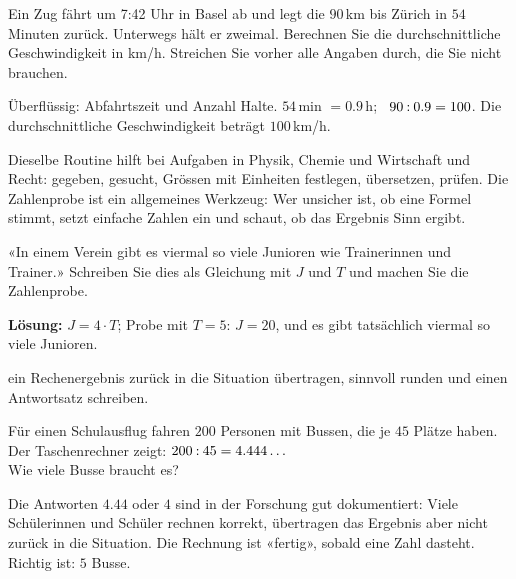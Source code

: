 \documentclass[11pt]{exam}
\begin{document}
\begin{questions}
\question Ein Zug fährt um 7:42 Uhr in Basel ab und legt die $90$\,km bis
Zürich in $54$ Minuten zurück. Unterwegs hält er zweimal.
Berechnen Sie die durchschnittliche Geschwindigkeit in km/h. Streichen Sie
vorher alle Angaben durch, die Sie nicht brauchen.
\begin{solution}
  Überflüssig: Abfahrtszeit und Anzahl Halte. $54$\,min $= 0.9$\,h;
  \ $90 \mathbin{:} 0.9 = 100$. Die durchschnittliche Geschwindigkeit beträgt
  $100$\,km/h.
\end{solution}
\raum{3cm}

\end{questions}

\begin{transfer}
Dieselbe Routine hilft bei Aufgaben in Physik, Chemie und Wirtschaft und
Recht: gegeben, gesucht, Grössen mit Einheiten festlegen, übersetzen, prüfen.
Die Zahlenprobe ist ein allgemeines Werkzeug: Wer unsicher ist, ob eine
Formel stimmt, setzt einfache Zahlen ein und schaut, ob das Ergebnis Sinn
ergibt.
\end{transfer}

\begin{exitfrage}
«In einem Verein gibt es viermal so viele Junioren wie Trainerinnen und
Trainer.» Schreiben Sie dies als Gleichung mit $J$ und $T$ und machen Sie die
Zahlenprobe.
\ifprintanswers\par\medskip\textbf{Lösung:} $J = 4 \cdot T$; Probe mit
$T = 5$: $J = 20$, und es gibt tatsächlich viermal so viele Junioren.
\else\par\vspace{1.5cm}\fi
\end{exitfrage}

\newpage
{}
  {ein Rechenergebnis zurück in die Situation übertragen, sinnvoll runden und
   einen Antwortsatz schreiben.}

\begin{einstieg}
Für einen Schulausflug fahren $200$ Personen mit Bussen, die je $45$ Plätze
haben. Der Taschenrechner zeigt: $200 \mathbin{:} 45 = 4.444\ldots$ \\
Wie viele Busse braucht es?
\ifprintanswers\else\par\vspace{1cm}\fi
\end{einstieg}

\begin{lehrperson}
Die Antworten $4.44$ oder $4$ sind in der Forschung gut dokumentiert: Viele
Schülerinnen und Schüler rechnen korrekt, übertragen das Ergebnis aber nicht
zurück in die Situation. Die Rechnung ist «fertig», sobald eine Zahl
dasteht. Richtig ist: $5$ Busse.
\end{lehrperson}
\end{document}
